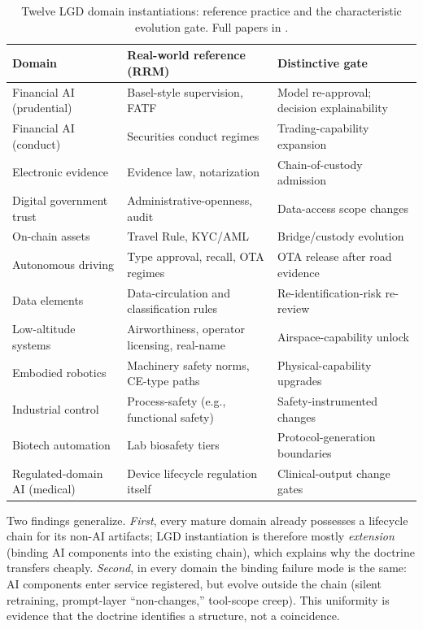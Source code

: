 \documentclass[12pt]{article}
\begin{document}
\begin{table}[h]
\centering\small
\begin{tabular}{@{}lll@{}}
\toprule
\textbf{Domain} & \textbf{Real-world reference (RRM)} & \textbf{Distinctive gate} \\
\midrule
Financial AI (prudential) & Basel-style supervision, FATF & Model re-approval; decision explainability \\
Financial AI (conduct) & Securities conduct regimes & Trading-capability expansion \\
Electronic evidence & Evidence law, notarization & Chain-of-custody admission \\
Digital government trust & Administrative-openness, audit & Data-access scope changes \\
On-chain assets & Travel Rule, KYC/AML & Bridge/custody evolution \\
Autonomous driving & Type approval, recall, OTA regimes & OTA release after road evidence \\
Data elements & Data-circulation and classification rules & Re-identification-risk re-review \\
Low-altitude systems & Airworthiness, operator licensing, real-name & Airspace-capability unlock \\
Embodied robotics & Machinery safety norms, CE-type paths & Physical-capability upgrades \\
Industrial control & Process-safety (e.g., functional safety) & Safety-instrumented changes \\
Biotech automation & Lab biosafety tiers & Protocol-generation boundaries \\
Regulated-domain AI (medical) & Device lifecycle regulation itself & Clinical-output change gates \\
\bottomrule
\end{tabular}
\caption{Twelve LGD domain instantiations: reference practice and the characteristic evolution gate. Full papers in \cite{lgdrepo}.}
\label{tab:domains}
\end{table}

Two findings generalize. \emph{First}, every mature domain already possesses a lifecycle chain for its non-AI artifacts; LGD instantiation is therefore mostly \emph{extension} (binding AI components into the existing chain), which explains why the doctrine transfers cheaply. \emph{Second}, in every domain the binding failure mode is the same: AI components enter service registered, but evolve outside the chain (silent retraining, prompt-layer ``non-changes,'' tool-scope creep). This uniformity is evidence that the doctrine identifies a structure, not a coincidence.
\end{document}
